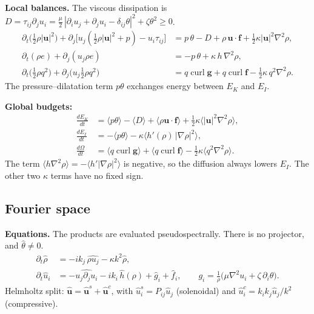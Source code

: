 \documentclass[11pt]{article}
\newcommand{\avg}[1]{\langle #1\rangle}
\newcommand{\curl}{\operatorname{curl}}
\begin{document}
\textbf{Local balances.} The viscous dissipation is $D=\tau_{ij}\partial_ju_i=\tfrac\mu2\,|\partial_iu_j+\partial_ju_i-\delta_{ij}\theta|^2+\zeta\theta^2\ge0$.
\begin{align}
\partial_t\big(\tfrac12\rho|\bm u|^2\big)+\partial_j\big[u_j(\tfrac12\rho|\bm u|^2+p)-u_i\tau_{ij}\big]&=p\,\theta-D+\rho\,\bm u\cdot\bm f+\tfrac12\kappa|\bm u|^2\nabla^2\rho,\\
\partial_t(\rho e)+\partial_j(u_j\rho e)&=-p\,\theta+\kappa\,h\,\nabla^2\rho,\\
\partial_t\big(\tfrac12\rho q^2\big)+\partial_j\big(u_j\tfrac12\rho q^2\big)&=q\curl\bm g+q\curl\bm f-\tfrac12\kappa\,q^2\nabla^2\rho .
\end{align}
The pressure--dilatation term $p\theta$ exchanges energy between $E_K$ and $E_I$.

\textbf{Global budgets:}
\begin{align}
\frac{dE_K}{dt}&=\avg{p\theta}-\avg{D}+\avg{\rho\bm u\cdot\bm f}+\tfrac12\kappa\avg{|\bm u|^2\nabla^2\rho},\\
\frac{dE_I}{dt}&=-\avg{p\theta}-\kappa\avg{h'(\rho)\,|\nabla\rho|^2},\\
\frac{d\Omega}{dt}&=\avg{q\curl\bm g}+\avg{q\curl\bm f}-\tfrac12\kappa\avg{q^2\nabla^2\rho}.
\end{align}
The term $\avg{h\nabla^2\rho}=-\avg{h'|\nabla\rho|^2}$ is negative, so the diffusion always lowers $E_I$. The other two $\kappa$ terms have no fixed sign.

\subsection{Fourier space}

\textbf{Equations.} The products are evaluated pseudospectrally. There is no projector, and $\hat\theta\neq0$.
\begin{align}
\partial_t\hat\rho&=-ik_j\,\widehat{\rho u_j}-\kappa k^2\hat\rho,\\
\partial_t\hat u_i&=-\widehat{u_j\partial_ju_i}-ik_i\,\hat h(\rho)+\hat g_i+\hat f_i,\qquad
g_i=\frac1\rho\big(\mu\nabla^2u_i+\zeta\,\partial_i\theta\big).
\end{align}
Helmholtz split: $\hat{\bm u}=\hat{\bm u}^s+\hat{\bm u}^c$, with $\hat u^s_i=P_{ij}\hat u_j$ (solenoidal) and $\hat u^c_i=k_ik_j\hat u_j/k^2$ (compressive).
\end{document}

